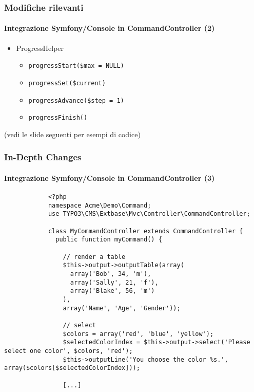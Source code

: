 \begin{frame}[fragile]
	\frametitle{Modifiche rilevanti}
	\framesubtitle{Integrazione Symfony/Console in CommandController (2)}

	\lstset{basicstyle=\tiny\ttfamily}

	\begin{itemize}
		\item \smaller ProgressHelper
			\begin{itemize}
				\item \smaller\texttt{progressStart(\$max = NULL)}
				\item \texttt{progressSet(\$current)}
				\item \texttt{progressAdvance(\$step = 1)}
				\item \texttt{progressFinish()}
			\end{itemize}
	\end{itemize}

	\smaller
		(vedi le slide seguenti per esempi di codice)
	\normalsize

\end{frame}


\begin{frame}[fragile]
	\frametitle{In-Depth Changes}
	\framesubtitle{Integrazione Symfony/Console in CommandController (3)}

	\lstset{basicstyle=\tiny\ttfamily}

		\begin{lstlisting}
			<?php
			namespace Acme\Demo\Command;
			use TYPO3\CMS\Extbase\Mvc\Controller\CommandController;

			class MyCommandController extends CommandController {
			  public function myCommand() {

			    // render a table
			    $this->output->outputTable(array(
			      array('Bob', 34, 'm'),
			      array('Sally', 21, 'f'),
			      array('Blake', 56, 'm')
			    ),
			    array('Name', 'Age', 'Gender'));

			    // select
			    $colors = array('red', 'blue', 'yellow');
			    $selectedColorIndex = $this->output->select('Please select one color', $colors, 'red');
			    $this->outputLine('You choose the color %s.', array($colors[$selectedColorIndex]));

			    [...]
		\end{lstlisting}

\end{frame}

